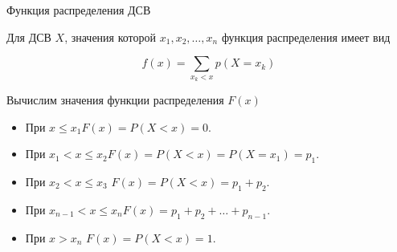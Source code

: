 \documentclass[unicode,11pt,notheorems,xcolor=table]{beamer}
\begin{document}
\begin{frame}{Функция распределения ДСВ}{}
\begin{block}{}
 Для ДСВ $X$, значения которой $x_1, x_2,\ldots, x_n$
  функция распределения имеет вид 
  
  $$
    f(x) = \sum_{x_k<x} p(X=x_k)
  $$
\end{block}

Вычислим значения функции распределения $F(x)$

 \begin{itemize}
     \item  При $x \leqslant x_1 $\hfill$F (x) = P (X < x) = 0$.
     \item  При $ x_1< x \leqslant x_2 $\hfill $F (x) = P (X < x) = P(X=x_1)=p_1$.
     \item  При $ x_2< x \leqslant x_3 $\hfill 
     $F (x) = P (X < x) = p_1+p_2$.
     \item  При $ x_{n-1}< x \leqslant x_n $\hfill $F (x) = p_1+p_2+ \ldots + p_{n-1}$.
     \item При $ x >x_n$ \hfill $F (x) = P (X < x) = 1$.
 \end{itemize}
\end{frame}
\end{document}
